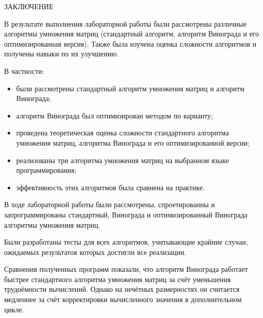 \begin{center}
    \MakeUppercase{\large Заключение}
\end{center}

В результате выполнения лабораторной работы были рассмотрены различные алгоритмы умножения матриц (стандартный алгоритм, алгоритм Винограда и его оптимизированная версия). Также была изучена оценка сложности алгоритмов и получены навыки по их улучшению.

\vspace{0.25cm}
В частности:

\begin{itemize}

\item были рассмотрены стандартный алгоритм умножения матриц и алгоритм Винограда;

\item алгоритм Винограда был оптимизирован методом по варианту;

\item проведена теоретическая оценка сложности стандартного алгоритма умножения матриц, алгоритма Винограда и его оптимизированной версии;

\item реализованы три алгоритма умножения матриц на выбранном языке программирования;

\item эффективность этих алгоритмов была сравнена на практике.

\end{itemize}

В ходе лабораторной работы были рассмотрены, спроетированны и запрограммированы стандартный, Винограда и оптимизированный Винограда алгоритмы умножения матриц.

Были разработаны тесты для всех алгоритмов, учитывающие крайние случаи, ожидаемых результатов которых достигли все реализации.

Сравнения полученных программ показали, что алгоритм Винограда работает быстрее стандартного алгоритма умножения матриц за счёт уменьшения трудоёмности вычислений. Однако на нечётных размерностях он считается медленнее за счёт корректировки вычисленного значения в дополнительном цикле.

\newpage